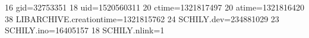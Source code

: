 16 gid=32753351
18 uid=1520560311
20 ctime=1321817497
20 atime=1321816420
38 LIBARCHIVE.creationtime=1321815762
24 SCHILY.dev=234881029
23 SCHILY.ino=16405157
18 SCHILY.nlink=1
